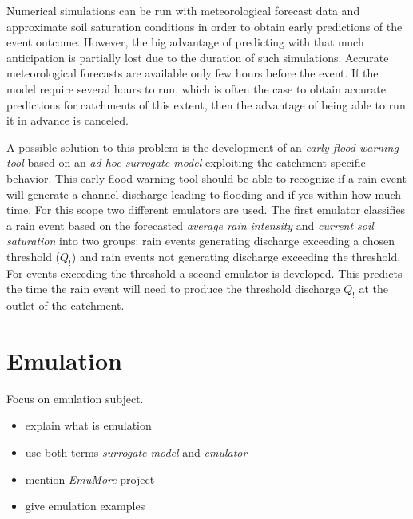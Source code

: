 Numerical simulations can be run with meteorological forecast data and approximate soil saturation conditions in order to obtain early predictions of the event outcome.
However, the big advantage of predicting with that much anticipation is partially lost due to the duration of such simulations.
Accurate meteorological forecasts are available only few hours before the event.
If the model require several hours to run, which is often the case to obtain accurate predictions for catchments of this extent, then the advantage of being able to run it in advance is canceled.

A possible solution to this problem is the development of an \emph{early flood warning tool} based on an \emph{ad hoc surrogate model} exploiting the catchment specific behavior.
This early flood warning tool should be able to recognize if a rain event will generate a channel discharge leading to flooding and if yes within how much time.
For this scope two different emulators are used.
The first emulator classifies a rain event based on the forecasted \emph{average rain intensity} and \emph{current soil saturation} into two groups: rain events generating discharge exceeding a chosen threshold ($Q_!$) and rain events not generating discharge exceeding the threshold.
For events exceeding the threshold a second emulator is developed.
This predicts the time the rain event will need to produce the threshold discharge $Q_!$ at the outlet of the catchment.



\section{Emulation}

Focus on emulation subject.

\begin{itemize}
\itemsep0em
  \item explain what is emulation
  \item use both terms \textit{surrogate model} and \textit{emulator}
  \item mention \textit{EmuMore} project
  \item give emulation examples
\end{itemize}


